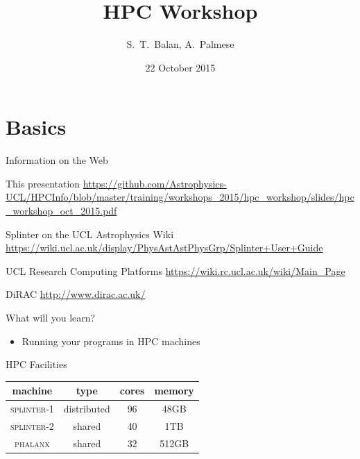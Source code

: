 \documentclass{beamer}
\title[HPC Workshop] %
{HPC Workshop}
\author[Balan,Palmese] %
{S.~T.~Balan, A.~Palmese}
\institute[UCL]
{
  Department of Physics and Astronomy\\
  University College London
}
\date[HPC 2015]
{22 October 2015}
\begin{document}
\frame{\titlepage}

\section{Basics}

\begin{frame}{Information on the Web}
  \begin{block}{This presentation}
    \url{https://github.com/Astrophysics-UCL/HPCInfo/blob/master/training/workshops_2015/hpc_workshop/slides/hpc_workshop_oct_2015.pdf}
  \end{block}

    \begin{block}{Splinter on the UCL Astrophysics Wiki}
    \url{https://wiki.ucl.ac.uk/display/PhysAstAstPhysGrp/Splinter+User+Guide}
  \end{block}

  \begin{block}{UCL Research Computing Platforms}
    \url{https://wiki.rc.ucl.ac.uk/wiki/Main_Page}
  \end{block}

  \begin{block}{DiRAC}
    \url{http://www.dirac.ac.uk/}
  \end{block}

\end{frame}

\begin{frame}{What will you learn?}
  \begin{itemize}
    \item Running your programs in HPC machines
  \end{itemize}
\end{frame}


\begin{frame}{HPC Facilities}
  \begin{table}
    \begin{tabular}{|c|c|c|c|}
      \hline
      machine & type & cores & memory  \\
      \hline
      \textsc{splinter}-1 & distributed & 96 & 48GB  \\
      \textsc{splinter}-2 & shared & 40 & 1TB \\
      \textsc{phalanx} & shared & 32 & 512GB \\
      \hline
    \end{tabular}
  \end{table}
\end{frame}
\end{document}
